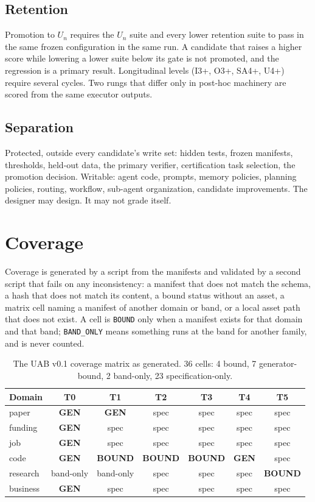 \subsection{Retention}

Promotion to $U_n$ requires the $U_n$ suite and every lower retention suite to pass in the same frozen configuration in the same run. A candidate that raises a higher score while lowering a lower suite below its gate is not promoted, and the regression is a primary result. Longitudinal levels (I3+, O3+, SA4+, U4+) require several cycles. Two rungs that differ only in post-hoc machinery are scored from the same executor outputs.

\subsection{Separation}

Protected, outside every candidate's write set: hidden tests, frozen manifests, thresholds, held-out data, the primary verifier, certification task selection, the promotion decision. Writable: agent code, prompts, memory policies, planning policies, routing, workflow, sub-agent organization, candidate improvements. The designer may design. It may not grade itself.

\section{Coverage}\label{sec:coverage}

Coverage is generated by a script from the manifests and validated by a second script that fails on any inconsistency: a manifest that does not match the schema, a hash that does not match its content, a bound status without an asset, a matrix cell naming a manifest of another domain or band, or a local asset path that does not exist. A cell is \texttt{BOUND} only when a manifest exists for that domain and that band; \texttt{BAND\_ONLY} means something runs at the band for another family, and is never counted.

\begin{table}[H]
\centering\small
\begin{tabularx}{\textwidth}{@{}lcccccc@{}}
\toprule
Domain & T0 & T1 & T2 & T3 & T4 & T5 \\
\midrule
paper & \textbf{GEN} & \textbf{GEN} & spec & spec & spec & spec \\
funding & \textbf{GEN} & spec & spec & spec & spec & spec \\
job & \textbf{GEN} & spec & spec & spec & spec & spec \\
code & \textbf{GEN} & \textbf{BOUND} & \textbf{BOUND} & \textbf{BOUND} & \textbf{GEN} & spec \\
research & band-only & band-only & spec & spec & spec & \textbf{BOUND} \\
business & \textbf{GEN} & spec & spec & spec & spec & spec \\
\bottomrule
\end{tabularx}
\caption{The UAB v0.1 coverage matrix as generated. 36 cells: 4 bound, 7 generator-bound, 2 band-only, 23 specification-only.}
\label{tab:matrix}
\end{table}

